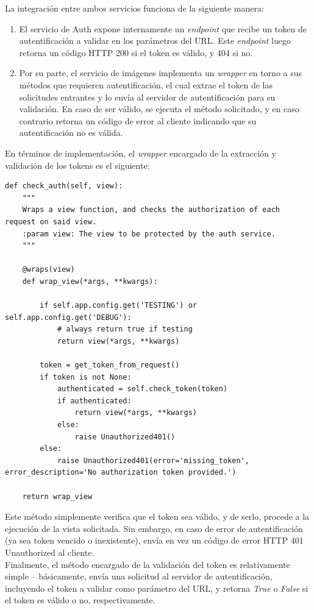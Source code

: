 \documentclass[11pt,letterpaper]{article}
\begin{document}
La integración entre ambos servicios funciona de la siguiente manera:
\begin{enumerate}
    \item El servicio de Auth expone internamente un \emph{endpoint} que recibe un token de autentificación a validar en los parámetros del URL. Este \emph{endpoint} luego retorna un código HTTP 200 si el token es válido, y 404 si no.
    \item Por su parte, el servicio de imágenes implementa un \emph{wrapper} en torno a sus métodos que requieren autentificación, el cual extrae el token de las solicitudes entrantes y lo envía al servidor de autentificación para su validación. En caso de ser válido, se ejecuta el método solicitado, y en caso contrario retorna un código de error al cliente indicando que su autentificación no es válida.
\end{enumerate}
\pagebreak
En términos de implementación, el \emph{wrapper} encargado de la extracción y validación de los tokens es el siguiente:
\begin{lstlisting}
def check_auth(self, view):
    """
    Wraps a view function, and checks the authorization of each request on said view.
    :param view: The view to be protected by the auth service.
    """

    @wraps(view)
    def wrap_view(*args, **kwargs):

        if self.app.config.get('TESTING') or self.app.config.get('DEBUG'):
            # always return true if testing
            return view(*args, **kwargs)

        token = get_token_from_request()
        if token is not None:
            authenticated = self.check_token(token)
            if authenticated:
                return view(*args, **kwargs)
            else:
                raise Unauthorized401()
        else:
            raise Unauthorized401(error='missing_token', error_description='No authorization token provided.')

    return wrap_view
\end{lstlisting}
Este método simplemente verifica que el token sea válido, y de serlo, procede a la ejecución de la vista solicitada. Sin embargo, en caso de error de autentificación (ya sea token vencido o inexistente), envía en vez un código de error HTTP 401 Unauthorized al cliente.\\

Finalmente, el método encargado de la validación del token es relativamente simple -- básicamente, envía una solicitud al servidor de autentificación, incluyendo el token a validar como parámetro del URL, y retorna \emph{True} o \emph{False} si el token es válido o no, respectivamente.
\end{document}

